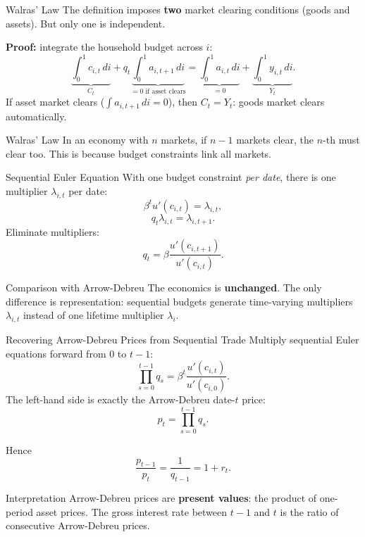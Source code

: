 \documentclass[aspectratio=169,10pt]{beamer}
\newcommand{\apxbutton}[1]{\hfill\hyperlink{#1}{\beamerbutton{Appendix}}}
\begin{document}
\begin{frame}{Walras' Law}
The definition imposes \textbf{two} market clearing conditions (goods and assets). But only one is independent.

\medskip
\textbf{Proof:} integrate the household budget across $i$:
\[
\underbrace{\int_0^1 c_{i,t}\,di}_{C_t} + q_t\underbrace{\int_0^1 a_{i,t+1}\,di}_{=0\text{ if asset clears}} = \underbrace{\int_0^1 a_{i,t}\,di}_{=0} + \underbrace{\int_0^1 y_{i,t}\,di}_{Y_t}.
\]
If asset market clears ($\int a_{i,t+1}\,di=0$), then $C_t=Y_t$: goods market clears automatically.

\begin{block}{Walras' Law}
In an economy with $n$ markets, if $n-1$ markets clear, the $n$-th must clear too. This is because budget constraints link all markets.
\end{block}
\end{frame}

\begin{frame}{Sequential Euler Equation}
\hypertarget{m-a5}{}
With one budget constraint \emph{per date}, there is one multiplier $\lambda_{i,t}$ per date:
\[
\beta^t u'(c_{i,t})=\lambda_{i,t},
\tag{5.21}
\]
\[
q_t\lambda_{i,t}=\lambda_{i,t+1}.
\tag{5.22}
\]
Eliminate multipliers:
\[
\boxed{q_t=\beta\frac{u'(c_{i,t+1})}{u'(c_{i,t})}.}
\]

\begin{block}{Comparison with Arrow-Debreu}
The economics is \textbf{unchanged}. The only difference is representation: sequential budgets generate time-varying multipliers $\lambda_{i,t}$ instead of one lifetime multiplier $\lambda_i$.
\end{block}
\apxbutton{a5}
\end{frame}

\begin{frame}{Recovering Arrow-Debreu Prices from Sequential Trade}
\hypertarget{m-a6}{}
Multiply sequential Euler equations forward from 0 to $t-1$:
\[
\prod_{s=0}^{t-1} q_s
=
\beta^t\frac{u'(c_{i,t})}{u'(c_{i,0})}.
\]
The left-hand side is exactly the Arrow-Debreu date-$t$ price:
\[
\boxed{p_t=\prod_{s=0}^{t-1} q_s.}
\]

Hence
\[
\frac{p_{t-1}}{p_t}=\frac{1}{q_{t-1}}=1+r_t.
\]

\begin{block}{Interpretation}
Arrow-Debreu prices are \textbf{present values}: the product of one-period asset prices. The gross interest rate between $t-1$ and $t$ is the ratio of consecutive Arrow-Debreu prices.
\end{block}
\apxbutton{a6}
\end{frame}
\end{document}

